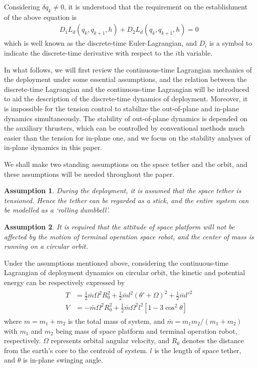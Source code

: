 \documentclass[10pt,onecolumn,draftcls]{IEEEtran}
\newtheorem{myas}{Assumption}
\begin{document}
Considering  $\delta q_k\neq 0$, it is understood that the requirement on the establishment of the above equation is 
\begin{align}\label{eq:discrete EL}
	D_1L_d(q_k,q_{k+1},h)+D_2L_d(q_k,q_{k+1},h)=0
\end{align}
which is well known as the discrete-time Euler-Lagrangian, and $D_i$ is a symbol to indicate the discrete-time derivative with respect to the $i$th variable.

In what follows, we will first review the continuous-time Lagrangian mechanics of the deployment under some essential assumptions, and the relation between the discrete-time Lagrangian and the continuous-time Lagrangian will be introduced to aid the description of the discrete-time dynamics of deployment. Moreover, it is impossible for the tension control to stabilize the out-of-plane and in-plane dynamics simultaneously. The stability of out-of-plane dynamics is depended on the auxiliary thrusters, which can be controlled by conventional methods much easier than the tension for in-plane one, and we focus on the stability analyses of in-plane dynamics in this paper.  

We shall make two standing assumptions on the space tether and the orbit, and these assumptions will be needed throughout the paper.  
\begin{myas}
	During the deployment, it is assumed that the space tether is tensioned. Hence the tether can be regarded as a stick, and the entire system can be modelled as a `rolling dumbbell'.
\end{myas}
\begin{myas}
	It is required that the attitude of space platform will not be affected by the motion of terminal operation space robot, and the center of mass is running on a circular orbit.
\end{myas}

Under the assumptions mentioned above, considering the continuous-time Lagrangian of deployment dynamics on circular orbit, the kinetic and potential energy can be respectively expressed by
	\begin{align}\begin{split}
	T&=\frac{1}{2}\bar m\Omega^2R_0^2+\frac{1}{2}\bar{m}l^2(\theta'+\Omega)^2+\frac{1}{2}\bar{m}l'^2\\
	V&=-\bar m\Omega^2R^2_0+\frac{1}{2}\bar{m}\Omega^2l^2[1-3\cos^2\theta]
	\end{split}\end{align}
	where $m=m_1+m_2$ is the total mass of system, and $\bar m=m_1m_2/(m_1+m_2)$ with $m_1$ and $m_2$ being mass of space platform and terminal operation robot, respectively. $\Omega$ represents orbital angular velocity, and $R_0$ denotes the distance from the earth's core to the centroid of system. $l$ is the length of space tether, and $\theta$ is in-plane swinging angle. 
	
\end{document}
